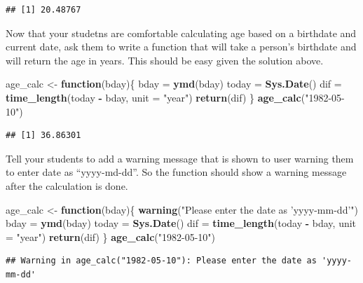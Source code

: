 \documentclass[]{book}
\newenvironment{Shaded}{\begin{snugshade}}{\end{snugshade}}
\newcommand{\ControlFlowTok}[1]{\textcolor[rgb]{0.13,0.29,0.53}{\textbf{#1}}}
\newcommand{\DataTypeTok}[1]{\textcolor[rgb]{0.13,0.29,0.53}{#1}}
\newcommand{\KeywordTok}[1]{\textcolor[rgb]{0.13,0.29,0.53}{\textbf{#1}}}
\newcommand{\NormalTok}[1]{#1}
\newcommand{\OperatorTok}[1]{\textcolor[rgb]{0.81,0.36,0.00}{\textbf{#1}}}
\newcommand{\StringTok}[1]{\textcolor[rgb]{0.31,0.60,0.02}{#1}}
\begin{document}
\begin{verbatim}
## [1] 20.48767
\end{verbatim}

Now that your studetns are comfortable calculating age based on a birthdate and current date, ask them to write a function that will take a person's birthdate and will return the age in years. This should be easy given the solution above.

\begin{Shaded}
\begin{Highlighting}[]
\NormalTok{age_calc <-}\StringTok{ }\ControlFlowTok{function}\NormalTok{(bday)\{}
\NormalTok{    bday =}\StringTok{ }\KeywordTok{ymd}\NormalTok{(bday)}
\NormalTok{    today =}\StringTok{ }\KeywordTok{Sys.Date}\NormalTok{()}
\NormalTok{    dif =}\StringTok{ }\KeywordTok{time_length}\NormalTok{(today }\OperatorTok{-}\StringTok{ }\NormalTok{bday, }\DataTypeTok{unit =} \StringTok{"year"}\NormalTok{)}
    \KeywordTok{return}\NormalTok{(dif)}
\NormalTok{\}}
\KeywordTok{age_calc}\NormalTok{(}\StringTok{"1982-05-10"}\NormalTok{)}
\end{Highlighting}
\end{Shaded}

\begin{verbatim}
## [1] 36.86301
\end{verbatim}

Tell your students to add a warning message that is shown to user warning them to enter date as ``yyyy-md-dd''. So the function should show a warning message after the calculation is done.

\begin{Shaded}
\begin{Highlighting}[]
\NormalTok{age_calc <-}\StringTok{ }\ControlFlowTok{function}\NormalTok{(bday)\{}
    \KeywordTok{warning}\NormalTok{(}\StringTok{"Please enter the date as 'yyyy-mm-dd'"}\NormalTok{)}
\NormalTok{    bday =}\StringTok{ }\KeywordTok{ymd}\NormalTok{(bday)}
\NormalTok{    today =}\StringTok{ }\KeywordTok{Sys.Date}\NormalTok{()}
\NormalTok{    dif =}\StringTok{ }\KeywordTok{time_length}\NormalTok{(today }\OperatorTok{-}\StringTok{ }\NormalTok{bday, }\DataTypeTok{unit =} \StringTok{"year"}\NormalTok{)}
    \KeywordTok{return}\NormalTok{(dif)}
\NormalTok{\}}
\KeywordTok{age_calc}\NormalTok{(}\StringTok{"1982-05-10"}\NormalTok{)}
\end{Highlighting}
\end{Shaded}

\begin{verbatim}
## Warning in age_calc("1982-05-10"): Please enter the date as 'yyyy-mm-dd'
\end{verbatim}
\end{document}
